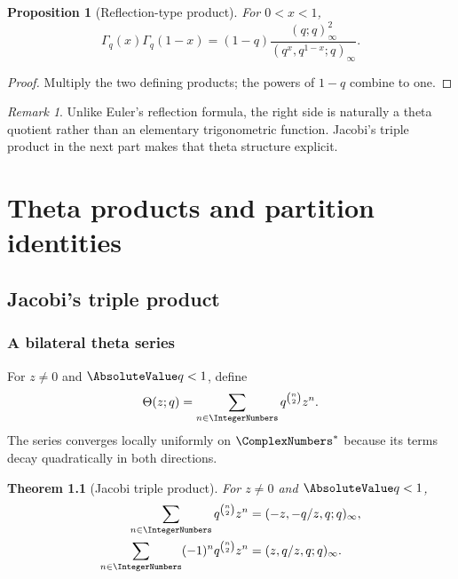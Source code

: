 \documentclass[11pt,a4paper,oneside,openany]{book}
\newtheorem{theorem}{Theorem}[chapter]
\newtheorem{proposition}[proposition]{Proposition}
\theoremstyle{definition}
\theoremstyle{remark}
\newtheorem{remark}[remark]{Remark}
\begin{document}
\begin{proposition}[Reflection-type product]\label{prop:qgamma-reflection}
For $0<x<1$,
\[
 \Gamma_q(x)\Gamma_q(1-x)
 =(1-q)\frac{(q;q)_\infty^2}
 {(q^x,q^{1-x};q)_\infty}.
\]
\end{proposition}

\begin{proof}
Multiply the two defining products; the powers of $1-q$ combine to one.
\end{proof}

\begin{remark}
Unlike Euler's reflection formula, the right side is naturally a theta quotient rather than an elementary trigonometric function.  Jacobi's triple product in the next part makes that theta structure explicit.
\end{remark}


\part{Theta products and partition identities}

\chapter{Jacobi's triple product}\label{chap:jtp}

\section{A bilateral theta series}

For $z\ne0$ and $\AbsoluteValue q<1$, define
\[
 \Theta(z;q)=\sum_{n\in\IntegerNumbers}q^{\binom n2}z^n.
\]
The series converges locally uniformly on $\ComplexNumbers^*$ because its terms decay quadratically in both directions.

\begin{theorem}[Jacobi triple product]\label{thm:jtp}
For $z\ne0$ and $\AbsoluteValue q<1$,
\begin{align}
 \sum_{n\in\IntegerNumbers}q^{\binom n2}z^n
 &=(-z,-q/z,q;q)_\infty,\label{eq:jtp-plus}\\
 \sum_{n\in\IntegerNumbers}(-1)^nq^{\binom n2}z^n
 &=(z,q/z,q;q)_\infty.\label{eq:jtp-minus}
\end{align}
\end{theorem}
\end{document}
